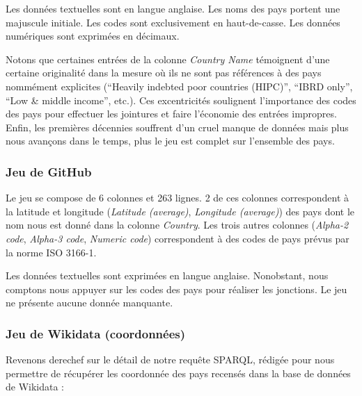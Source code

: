 \documentclass[hidelinks, 12pt]{article}
\begin{document}
Les données textuelles sont en langue anglaise. Les noms des pays portent une majuscule initiale. Les codes sont exclusivement en haut-de-casse. Les données numériques sont exprimées en décimaux.

Notons que certaines entrées de la colonne \textit{Country Name} témoignent d'une certaine originalité dans la mesure où ils ne sont pas références à des pays nommément explicites (\enquote{Heavily indebted poor countries (HIPC)}, \enquote{IBRD only}, \enquote{Low \& middle income}, etc.). Ces excentricités soulignent l'importance des codes des pays pour effectuer les jointures et faire l'économie des entrées impropres. Enfin, les premières décennies souffrent d'un cruel manque de données mais plus nous avançons dans le temps, plus le jeu est complet sur l'ensemble des pays.





%





\subsubsection{Jeu de GitHub}

Le jeu se compose de 6 colonnes et 263 lignes. 2 de ces colonnes correspondent à la latitude et longitude (\textit{Latitude (average)}, \textit{Longitude (average)}) des pays dont le nom nous est donné dans la colonne \textit{Country}. Les trois autres colonnes (\textit{Alpha-2 code}, \textit{Alpha-3 code}, \textit{Numeric code}) correspondent à des codes de pays prévus par la norme ISO 3166-1.

Les données textuelles sont exprimées en langue anglaise. Nonobstant, nous comptons nous appuyer sur les codes des pays pour réaliser les jonctions. Le jeu ne présente aucune donnée manquante. 





%





\subsubsection{Jeu de Wikidata (coordonnées)}

Revenons derechef sur le détail de notre requête SPARQL, rédigée pour nous permettre de récupérer les coordonnée des pays recensés dans la base de données de Wikidata :
\end{document}
